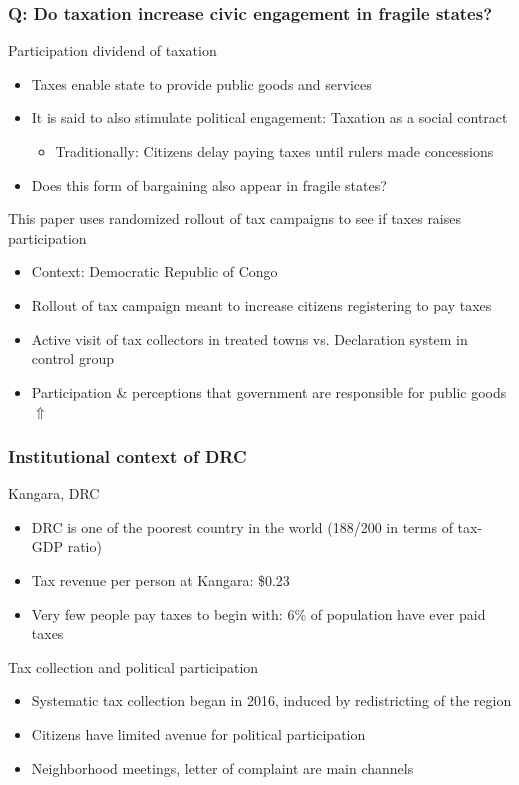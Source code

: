 \documentclass[aspectratio=169]{beamer}
\begin{document}
\begin{frame}
\frametitle{Q: Do taxation increase civic engagement in fragile states?}
Participation dividend of taxation
\begin{itemize}\setlength\itemsep{3pt}
\item Taxes enable state to provide public goods and services
\item It is said to also stimulate political engagement: Taxation as a social contract
\begin{itemize}
\item Traditionally: Citizens delay paying taxes until rulers made concessions
\end{itemize}
\item Does this form of bargaining also appear in fragile states?
\end{itemize}\medskip
This paper uses randomized rollout of tax campaigns to see if taxes raises participation
\begin{itemize}\setlength\itemsep{3pt}
\item Context: Democratic Republic of Congo
\item Rollout of tax campaign meant to increase citizens registering to pay taxes
\item Active visit of tax collectors in treated towns vs. Declaration system in control group
\item Participation \& perceptions that government are responsible for public goods $\Uparrow$
\end{itemize}
\end{frame}


\begin{frame}
\frametitle{Institutional context of DRC}
Kangara, DRC
\begin{itemize}\setlength\itemsep{3pt}
\item DRC is one of the poorest country in the world (188/200 in terms of tax-GDP ratio)
\item Tax revenue per person at Kangara: \$0.23 
\item Very few people pay taxes to begin with: 6\% of population have ever paid taxes
\end{itemize}\medskip
Tax collection and political participation
\begin{itemize}\setlength\itemsep{3pt}
\item Systematic tax collection began in 2016, induced by redistricting of the region
\item Citizens have limited avenue for political participation
\item Neighborhood meetings, letter of complaint are main channels
\end{itemize}
\end{frame}
\end{document}
